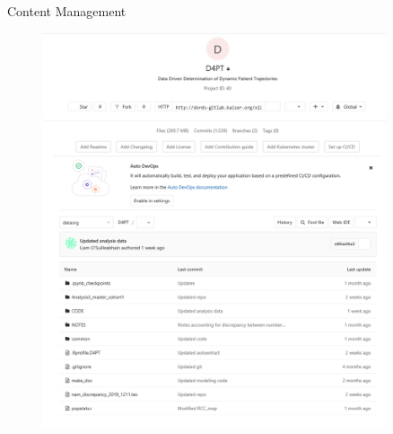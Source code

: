 \documentclass{beamer}
\begin{document}
\begin{frame}{Content Management}

\begin{minipage}{0.45\textwidth}
\begin{center}
\begin{figure}
\includegraphics[width=0.9\textwidth]{./git.PNG}
\end{figure}
\end{center}
\end{minipage}
\begin{minipage}{0.45\textwidth}
\begin{center}
\begin{figure}

\end{figure}
\end{center}
\end{minipage}
\end{frame}
\end{document}
